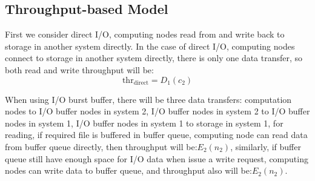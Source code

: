 \subsection{Throughput-based Model}
First we consider direct I/O, computing nodes read from and write back to storage in another system directly.
In the case of direct I/O, computing nodes connect to storage in another system directly, there is only one data transfer, so both read and write throughput will be:%
\begin{equation}
	\text{thr}_{\text{direct}}=D_1(c_2) \label{throughput1}
\end{equation}

When using I/O burst buffer, there will be three data transfers: computation nodes to I/O buffer nodes in system 2, I/O buffer nodes in system 2 to I/O buffer nodes in system 1, I/O buffer nodes in system 1 to storage in system 1, 
for reading, if required file is buffered in buffer queue, computing node can read data from buffer queue directly, then throughput will be:$E_2(n_2)$, similarly, if buffer queue still have enough space for I/O data when issue a write request, computing nodes can write data to buffer queue, and throughput also will be:$E_2(n_2)$.


